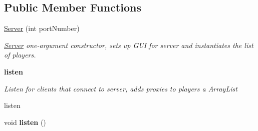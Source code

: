 \subsection*{Public Member Functions}
\begin{DoxyCompactItemize}
\item 
\hyperlink{classbattleship_1_1network_1_1Server_af912a2e659b7b3d611e3764736d32f98}{Server} (int port\+Number)
\begin{DoxyCompactList}\small\item\em \hyperlink{classbattleship_1_1network_1_1Server}{Server} one-\/argument constructor, sets up G\+U\+I for server and instantiates the list of players. \end{DoxyCompactList}\end{DoxyCompactItemize}
\begin{Indent}{\bf listen}\par
{\em Listen for clients that connect to server, adds proxie\textquotesingle{}s to players a Array\+List

listen }\begin{DoxyCompactItemize}
\item 
\hypertarget{classbattleship_1_1network_1_1Server_ae6f829869679e8b59fd1d3e1552242a1}{}void {\bfseries listen} ()\label{classbattleship_1_1network_1_1Server_ae6f829869679e8b59fd1d3e1552242a1}

\end{DoxyCompactItemize}
\end{Indent}
